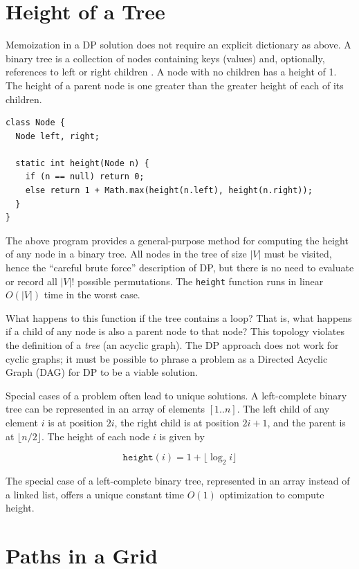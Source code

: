 \documentclass{book}
\begin{document}
\section{Height of a Tree}

Memoization in a DP solution does not require an explicit dictionary as above. A binary tree is a collection of nodes containing keys (values) and, optionally, references to left or right children \cite{rhodesTree}. A node with no children has a height of 1. The height of a parent node is one greater than the greater height of each of its children.

\begin{lstlisting}
class Node {
  Node left, right;

  static int height(Node n) {
    if (n == null) return 0;
    else return 1 + Math.max(height(n.left), height(n.right));
  }
}
\end{lstlisting}

The above program provides a general-purpose method for computing the height of any node in a binary tree. All nodes in the tree of size $|V|$ must be visited, hence the ``careful brute force'' description of DP, but there is no need to evaluate or record all $|V|!$ possible permutations. The \texttt{height} function runs in linear $O(|V|)$ time in the worst case.

What happens to this function if the tree contains a loop? That is, what happens if a child of any node is also a parent node to that node? This topology violates the definition of a \textit{tree} (an acyclic graph). The DP approach does not work for cyclic graphs; it must be possible to phrase a problem as a Directed Acyclic Graph (DAG) for DP to be a viable solution.

Special cases of a problem often lead to unique solutions. A left-complete binary tree can be represented in an array of elements $[1..n]$. The left child of any element $i$ is at position $2i$, the right child is at position $2i+1$, and the parent is at $\lfloor n/2 \rfloor$. The height of each node $i$ is given by

\begin{equation*}
\texttt{height}(i) = 1 + \lfloor \log_2{i} \rfloor
\end{equation*}

The special case of a left-complete binary tree, represented in an array instead of a linked list, offers a unique constant time $O(1)$ optimization to compute height.

\section{Paths in a Grid}
\end{document}
